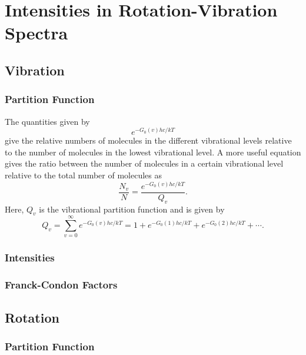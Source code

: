 \chapter{Intensities in Rotation-Vibration Spectra}
\label{c:intensities_in_rotation-vibration_spectra}

\section{Vibration}
\label{s:vibration}

\subsection{Partition Function}

The quantities given by
\begin{equation*}
    e^{-G_0(v)hc/kT}
\end{equation*}
give the relative numbers of molecules in the different vibrational levels relative to the number of molecules in the lowest vibrational level. A more useful equation gives the ratio between the number of molecules in a certain vibrational level relative to the total number of molecules as
\begin{equation*}
    \frac{N_v}{N} = \frac{e^{-G_0(v)hc / kT}}{Q_v}.
\end{equation*}
Here, $Q_v$ is the vibrational partition function and is given by
\begin{equation*}
    Q_v = \sum_{v=0}^{\infty}e^{-G_0(v)hc / kT} = 1 + e^{-G_0(1)hc / kT} + e^{-G_0(2)hc / kT} + \dotsb.
\end{equation*}

\subsection{Intensities}

\subsection{Franck-Condon Factors}

\section{Rotation}
\label{s:rotation}

\subsection{Partition Function}


